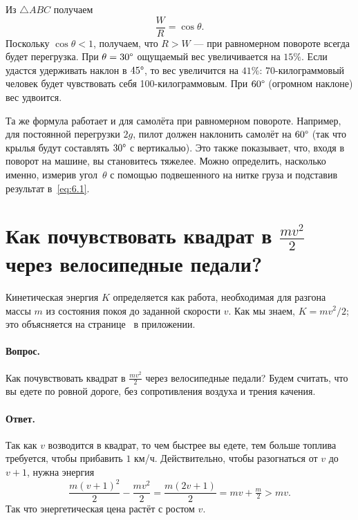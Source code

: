 Из $\triangle ABC$ получаем
\begin{equation}
\frac{W}{R}=\cos \theta.
\label{eq:6.1}
\end{equation}
Поскольку $\cos \theta < 1$, получаем, что $R > W$ --- при равномерном повороте всегда будет перегрузка.
При $\theta=30\degree$ ощущаемый вес увеличивается на $15\%$.
Если удастся удерживать наклон в $45\degree$, то вес увеличится на $41\%$: 70-килограммовый человек будет чувствовать себя 100-килограммовым.
При $60\degree$ (огромном наклоне) вес удвоится.

Та же формула работает и для самолёта при равномерном повороте.
Например, для постоянной перегрузки $2g$,
пилот должен наклонить самолёт на $60\degree$
(так что крылья будут составлять $30\degree$ с вертикалью).
Это также показывает, что, входя в поворот на машине, вы становитесь тяжелее.
Можно определить, насколько именно, измерив угол~$\theta$ с помощью подвешенного на нитке груза
и подставив результат в~\eqref{eq:6.1}.

\section[Как почувствовать квадрат в mv²/2]{\boldmath Как почувствовать квадрат в $\tfrac{mv^2}{2}$ через велосипедные педали?}

Кинетическая энергия $K$ определяется как работа, необходимая для разгона массы $m$ из состояния покоя до заданной скорости $v$.
Как мы знаем, $K=mv^2/2$;
это объясняется на странице~\pageref{Кинетическая энергия} в приложении.


\paragraph{Вопрос.}
Как почувствовать квадрат в $\tfrac{mv^2}{2}$ через велосипедные педали?
Будем считать, что вы едете по ровной дороге, без сопротивления воздуха и трения качения.%

\paragraph{Ответ.}\label{Ответ:Как почувствовать квадрат}
Так как $v$ возводится в квадрат, то чем быстрее вы едете,
тем больше топлива требуется, чтобы прибавить $1$ км/ч.
Действительно, чтобы разогнаться от $v$ до $v+1$, нужна энергия
\[
\frac{m(v+1)^2}{2}-\frac{mv^2}{2}
=
\frac{m(2v+1)}{2}
=
mv+\tfrac{m}{2}>mv.
\]
Так что энергетическая цена растёт с ростом $v$.

